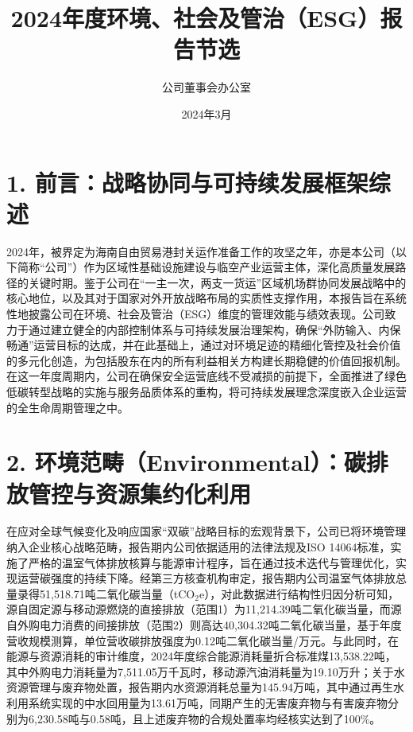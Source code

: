 \documentclass[a4paper,12pt]{article}
\title{\textbf{2024年度环境、社会及管治（ESG）报告节选}}
\author{公司董事会办公室}
\date{2024年3月}
\begin{document}
\maketitle


\section{1. 前言：战略协同与可持续发展框架综述}

2024年，被界定为海南自由贸易港封关运作准备工作的攻坚之年，亦是本公司（以下简称“公司”）作为区域性基础设施建设与临空产业运营主体，深化高质量发展路径的关键时期。鉴于公司在“一主一次，两支一货运”区域机场群协同发展战略中的核心地位，以及其对于国家对外开放战略布局的实质性支撑作用，本报告旨在系统性地披露公司在环境、社会及管治（ESG）维度的管理效能与绩效表现。公司致力于通过建立健全的内部控制体系与可持续发展治理架构，确保“外防输入、内保畅通”运营目标的达成，并在此基础上，通过对环境足迹的精细化管控及社会价值的多元化创造，为包括股东在内的所有利益相关方构建长期稳健的价值回报机制。在这一年度周期内，公司在确保安全运营底线不受减损的前提下，全面推进了绿色低碳转型战略的实施与服务品质体系的重构，将可持续发展理念深度嵌入企业运营的全生命周期管理之中。

\section{2. 环境范畴（Environmental）：碳排放管控与资源集约化利用}

在应对全球气候变化及响应国家“双碳”战略目标的宏观背景下，公司已将环境管理纳入企业核心战略范畴，报告期内公司依据适用的法律法规及ISO 14064标准，实施了严格的温室气体排放核算与能源审计程序，旨在通过技术迭代与管理优化，实现运营碳强度的持续下降。经第三方核查机构审定，报告期内公司温室气体排放总量录得51,518.71吨二氧化碳当量（tCO$_2$e），对此数据进行结构性归因分析可知，源自固定源与移动源燃烧的直接排放（范围1）为11,214.39吨二氧化碳当量，而源自外购电力消费的间接排放（范围2）则高达40,304.32吨二氧化碳当量，基于年度营收规模测算，单位营收碳排放强度为0.12吨二氧化碳当量/万元。与此同时，在能源与资源消耗的审计维度，2024年度综合能源消耗量折合标准煤13,538.22吨，其中外购电力消耗量为7,511.05万千瓦时，移动源汽油消耗量为19.10万升；关于水资源管理与废弃物处置，报告期内水资源消耗总量为145.94万吨，其中通过再生水利用系统实现的中水回用量为13.61万吨，同期产生的无害废弃物与有害废弃物分别为6,230.58吨与0.58吨，且上述废弃物的合规处置率均经核实达到了100\%。
\end{document}
